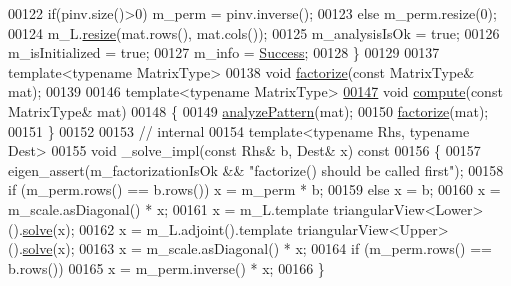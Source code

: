 \begin{DoxyCode}
00122       \textcolor{keywordflow}{if}(pinv.size()>0) m\_perm = pinv.inverse();
00123       \textcolor{keywordflow}{else}              m\_perm.resize(0);
00124       m\_L.\hyperlink{group___sparse_core___module_af88551f30202341b7cc24cfadabdec5c}{resize}(mat.rows(), mat.cols());
00125       m\_analysisIsOk = \textcolor{keyword}{true};
00126       m\_isInitialized = \textcolor{keyword}{true};
00127       m\_info = \hyperlink{group__enums_gga85fad7b87587764e5cf6b513a9e0ee5ea52581b035f4b59c203b8ff999ef5fcea}{Success};
00128     \}
00129     
00137     \textcolor{keyword}{template}<\textcolor{keyword}{typename} MatrixType>
00138     \textcolor{keywordtype}{void} \hyperlink{class_eigen_1_1_incomplete_cholesky_ac39c75ff7ca5d2db9a9f03b937e12601}{factorize}(\textcolor{keyword}{const} MatrixType& mat);
00139     
00146     \textcolor{keyword}{template}<\textcolor{keyword}{typename} MatrixType>
\hyperlink{class_eigen_1_1_incomplete_cholesky_a7966bedeebbeaa7a8fe4dd1da3797a0b}{00147}     \textcolor{keywordtype}{void} \hyperlink{class_eigen_1_1_incomplete_cholesky_a7966bedeebbeaa7a8fe4dd1da3797a0b}{compute}(\textcolor{keyword}{const} MatrixType& mat)
00148     \{
00149       \hyperlink{class_eigen_1_1_incomplete_cholesky_a702560ecdddef77dc51d20ab22bd974e}{analyzePattern}(mat);
00150       \hyperlink{class_eigen_1_1_incomplete_cholesky_ac39c75ff7ca5d2db9a9f03b937e12601}{factorize}(mat);
00151     \}
00152     
00153     \textcolor{comment}{// internal}
00154     \textcolor{keyword}{template}<\textcolor{keyword}{typename} Rhs, \textcolor{keyword}{typename} Dest>
00155     \textcolor{keywordtype}{void} \_solve\_impl(\textcolor{keyword}{const} Rhs& b, Dest& x)\textcolor{keyword}{ const}
00156 \textcolor{keyword}{    }\{
00157       eigen\_assert(m\_factorizationIsOk && \textcolor{stringliteral}{"factorize() should be called first"});
00158       \textcolor{keywordflow}{if} (m\_perm.rows() == b.rows())  x = m\_perm * b;
00159       \textcolor{keywordflow}{else}                            x = b;
00160       x = m\_scale.asDiagonal() * x;
00161       x = m\_L.template triangularView<Lower>().\hyperlink{group___sparse_core___module_a4a66e9498b06e3ec4ec36f06b26d4e8f}{solve}(x);
00162       x = m\_L.adjoint().template triangularView<Upper>().\hyperlink{group___sparse_core___module_a4a66e9498b06e3ec4ec36f06b26d4e8f}{solve}(x);
00163       x = m\_scale.asDiagonal() * x;
00164       \textcolor{keywordflow}{if} (m\_perm.rows() == b.rows())
00165         x = m\_perm.inverse() * x;
00166     \}

\end{DoxyCode}
